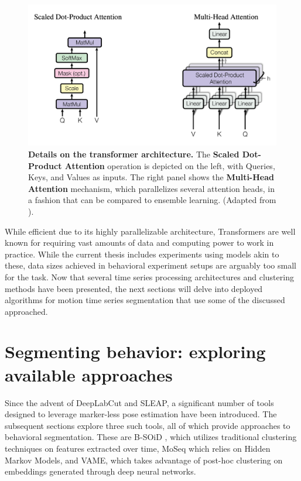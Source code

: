 \begin{figure}[!thb]
\centering
\includegraphics[width=\textwidth]{Figures/sota_7.pdf}

\caption[\textbf{Details on the transformer architecture}]{\textbf{Details on the transformer architecture.} The \textbf{Scaled Dot-Product Attention} operation is depicted on the left, with Queries, Keys, and Values as inputs. The right panel shows the \textbf{Multi-Head Attention} mechanism, which parallelizes several attention heads, in a fashion that can be compared to ensemble learning. (Adapted from \cite{Vaswani2017AttentionNeed}).}
\label{fig:2.7}

\end{figure}

While efficient due to its highly parallelizable architecture, Transformers are well known for requiring vast amounts of data and computing power to work in practice. While the current thesis includes experiments using models akin to these, data sizes achieved in behavioral experiment setups are arguably too small for the task.
Now that several time series processing architectures and clustering methods have been presented, the next sections will delve into deployed algorithms for motion time series segmentation that use some of the discussed approached.

\section{Segmenting behavior: exploring available approaches}

Since the advent of DeepLabCut and SLEAP, a significant number of tools designed to leverage marker-less pose estimation have been introduced. The subsequent sections explore three such tools, all of which provide approaches to behavioral segmentation. These are B-SOiD \cite{Hsu2021B-SOiDBehaviors}, which utilizes traditional clustering techniques on features extracted over time, MoSeq \cite{Weinreb2023Keypoint-MoSeq:Dynamics} which relies on Hidden Markov Models, and VAME, which takes advantage of post-hoc clustering on embeddings generated through deep neural networks.

